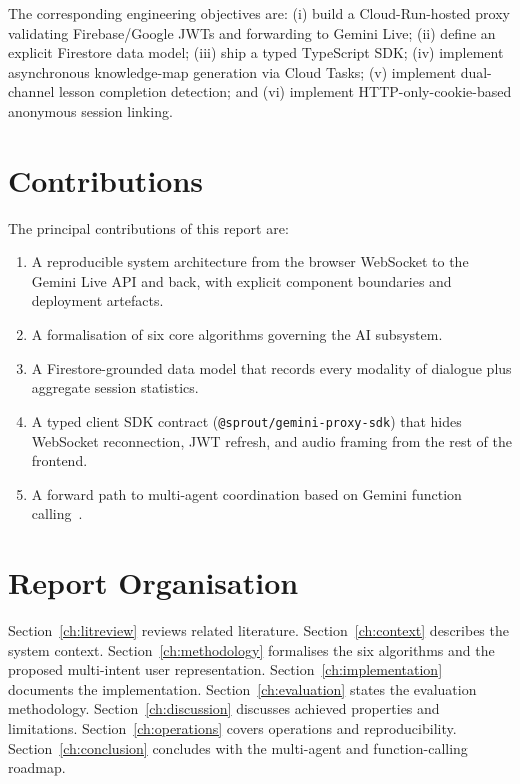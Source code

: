 The corresponding engineering objectives are: (i) build a Cloud-Run-hosted proxy validating Firebase/Google JWTs and forwarding to Gemini Live; (ii) define an explicit Firestore data model; (iii) ship a typed TypeScript SDK; (iv) implement asynchronous knowledge-map generation via Cloud Tasks; (v) implement dual-channel lesson completion detection; and (vi) implement HTTP-only-cookie-based anonymous session linking.

\section{Contributions}
\label{sec:contributions}

The principal contributions of this report are:
\begin{enumerate}
    \item A reproducible system architecture from the browser WebSocket to the Gemini Live API and back, with explicit component boundaries and deployment artefacts.
    \item A formalisation of six core algorithms governing the AI subsystem.
    \item A Firestore-grounded data model that records every modality of dialogue plus aggregate session statistics.
    \item A typed client SDK contract (\texttt{@sprout/gemini-proxy-sdk}) that hides WebSocket reconnection, JWT refresh, and audio framing from the rest of the frontend.
    \item A forward path to multi-agent coordination based on Gemini function calling~\cite{midscene2024,sprout2026multiagent}.
\end{enumerate}

\section{Report Organisation}
\label{sec:organisation}

Section~\ref{ch:litreview} reviews related literature. Section~\ref{ch:context} describes the system context. Section~\ref{ch:methodology} formalises the six algorithms and the proposed multi-intent user representation. Section~\ref{ch:implementation} documents the implementation. Section~\ref{ch:evaluation} states the evaluation methodology. Section~\ref{ch:discussion} discusses achieved properties and limitations. Section~\ref{ch:operations} covers operations and reproducibility. Section~\ref{ch:conclusion} concludes with the multi-agent and function-calling roadmap.
